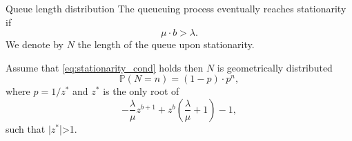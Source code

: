 \documentclass{beamer}
\begin{document}
\begin{frame}{Queue length distribution}
\scriptsize
The queueuing process eventually reaches stationarity if 
\begin{equation}\label{eq:stationarity_cond}
\mu\cdot b > \lambda.
\end{equation}
We denote by $N$ the length of the queue upon stationarity. 
\begin{tcolorbox}[enhanced,drop shadow, title=The blockchain efficiency theorem]
Assume that \eqref{eq:stationarity_cond} holds then $N$ is geometrically distributed 
$$
\mathbb{P}(N = n) = (1-p)\cdot p^n,
$$
where $p = 1/z^\ast$ and $z^\ast$ is the only root of 
$$
-\frac{\lambda}{\mu}z^{b+1}+z^b\left(\frac{\lambda}{\mu}+1\right) - 1,
$$
such that $|z^\ast$|>1.  
\end{tcolorbox}
\end{frame}
\end{document}
